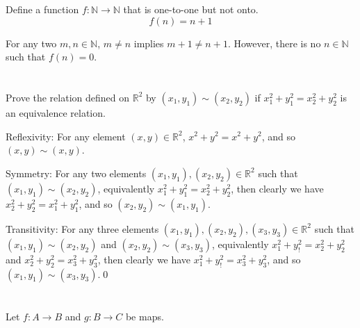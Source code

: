Define a function $f: \mathbb{N} \rightarrow \mathbb{N}$ that is one-to-one but not onto.
\hr
\[f(n) = n + 1\]

For any two $m, n \in \mathbb{N}$, $m \neq n$ implies $m + 1 \neq n + 1$. However, there is no $n \in \mathbb{N}$ such that $f(n) = 0$.

\section{}\label{sec:1-21}

Prove the relation defined on $\mathbb{R}^2$ by $(x_1, y_1) \sim (x_2, y_2)$ if $x_1^2 + y_1^2 = x_2^2 + y_2^2$ is an equivalence relation.
\hr

Reflexivity: For any element $(x,y) \in \mathbb{R}^2$, $x^2 + y^2 = x^2 + y^2$, and so $(x, y) \sim (x, y)$.

\smallskip

Symmetry: For any two elements $(x_1, y_1), (x_2, y_2) \in \mathbb{R}^2$ such that $(x_1, y_1) \sim (x_2, y_2)$, equivalently
$x_1^2 + y_1^2 = x_2^2 + y_2^2$, then clearly we have $x_2^2 + y_2^2 = x_1^2 + y_1^2$, and so $(x_2, y_2) \sim (x_1, y_1)$.

\smallskip

Transitivity: For any three elements $(x_1, y_1), (x_2, y_2), (x_3, y_3) \in \mathbb{R}^2$ such that \\$(x_1, y_1) \sim (x_2, y_2)$ and $(x_2, y_2) \sim (x_3, y_3)$, equivalently $x_1^2 + y_!^2 = x_2^2 + y_2^2$ and $x_2^2 + y_2^2 = x_3^2 + y_3^2$, then clearly we have $x_1^2 + y_!^2 = x_3^2 + y_3^2$, and so $(x_1, y_1) \sim (x_3, y_3)$.\qed

\section{}\label{sec:1-22}

Let $f:A \rightarrow B$ and $g:B \rightarrow C$ be maps.

